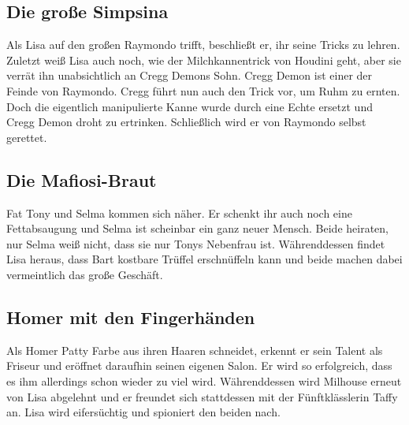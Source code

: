 \subsection{Die große Simpsina}
Als Lisa auf den großen Raymondo trifft, beschließt er, ihr seine Tricks zu lehren. Zuletzt weiß Lisa auch noch, wie der Milchkannentrick von Houdini geht, aber sie verrät ihn unabsichtlich an Cregg Demons Sohn. Cregg Demon ist einer der Feinde von Raymondo. Cregg führt nun auch den Trick vor, um Ruhm zu ernten. Doch die eigentlich manipulierte Kanne wurde durch eine Echte ersetzt und Cregg Demon droht zu ertrinken. Schließlich wird er von Raymondo selbst gerettet.


\subsection{Die Mafiosi-Braut}
Fat Tony und Selma kommen sich näher. Er schenkt ihr auch noch eine Fettabsaugung und Selma ist scheinbar ein ganz neuer Mensch. Beide heiraten, nur Selma weiß nicht, dass sie nur Tonys Nebenfrau ist. Währenddessen findet Lisa heraus, dass Bart kostbare Trüffel erschnüffeln kann und beide machen dabei vermeintlich das große Geschäft. 


\subsection{Homer mit den Fingerhänden}\label{NABF13}
Als Homer Patty Farbe aus ihren Haaren schneidet, erkennt er sein Talent als Friseur und eröffnet daraufhin seinen eigenen Salon. Er wird so erfolgreich, dass es ihm allerdings schon wieder zu viel wird. Währenddessen wird Milhouse erneut von Lisa abgelehnt und er freundet sich stattdessen mit der Fünftklässlerin Taffy an. Lisa wird eifersüchtig und spioniert den beiden nach.

